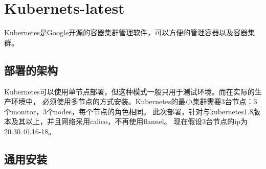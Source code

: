 \chapter{Kubernets-latest}
Kubernetes是Google开源的容器集群管理软件，可以方便的管理容器以及容器集群。

\section{部署的架构}
Kubernetes可以使用单节点部署，但这种模式一般只用于测试环境。而在实际的生产环境中，
必须使用多节点的方式安装。Kubernetes的最小集群需要3台节点：3个monitor，3个nodes，每个节点的角色相同。
此次部署，针对与kubernetes1.8版本及其以上，并且网络采用calico，不再使用flannel。
现在假设3台节点的ip为20.30.40.16-18。

\section{通用安装}

